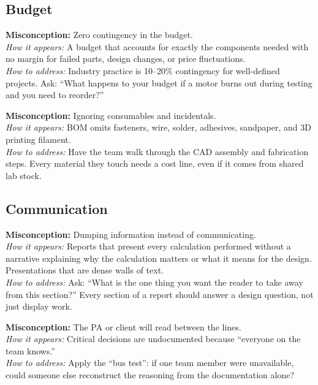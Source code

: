 \subsection{Budget}

\begin{redflag}
\textbf{Misconception:} Zero contingency in the budget.\\
\textit{How it appears:} A budget that accounts for exactly the components needed with no margin for failed parts, design changes, or price fluctuations.\\
\textit{How to address:} Industry practice is 10--20\% contingency for well-defined projects. Ask: ``What happens to your budget if a motor burns out during testing and you need to reorder?''
\end{redflag}

\begin{redflag}
\textbf{Misconception:} Ignoring consumables and incidentals.\\
\textit{How it appears:} BOM omits fasteners, wire, solder, adhesives, sandpaper, and 3D printing filament.\\
\textit{How to address:} Have the team walk through the CAD assembly and fabrication steps. Every material they touch needs a cost line, even if it comes from shared lab stock.
\end{redflag}

\subsection{Communication}

\begin{redflag}
\textbf{Misconception:} Dumping information instead of communicating.\\
\textit{How it appears:} Reports that present every calculation performed without a narrative explaining why the calculation matters or what it means for the design. Presentations that are dense walls of text.\\
\textit{How to address:} Ask: ``What is the one thing you want the reader to take away from this section?'' Every section of a report should answer a design question, not just display work.
\end{redflag}

\begin{redflag}
\textbf{Misconception:} The PA or client will read between the lines.\\
\textit{How it appears:} Critical decisions are undocumented because ``everyone on the team knows.''\\
\textit{How to address:} Apply the ``bus test'': if one team member were unavailable, could someone else reconstruct the reasoning from the documentation alone?
\end{redflag}

